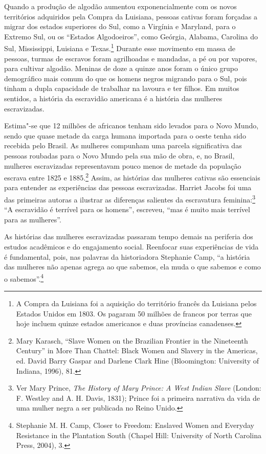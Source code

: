 Quando a produção de algodão aumentou exponencialmente com os novos
territórios adquiridos pela Compra da Luisiana, pessoas cativas
foram forçadas a migrar dos estados superiores do Sul, como a Virgínia e
Maryland, para o Extremo Sul, ou os ``Estados Algodoeiros'', como
Geórgia, Alabama, Carolina do Sul, Mississippi, Luisiana e
Texas.\footnote{A Compra da Luisiana foi a aquisição do território
  francês da Luisiana pelos Estados Unidos em 1803. Os  pagaram 50
  milhões de francos por terras que hoje incluem quinze estados
  americanos e duas províncias canadenses.} Durante esse movimento em
massa de pessoas, turmas de escravos foram agrilhoadas e
mandadas, a pé ou por vapores, para cultivar algodão. Meninas de doze a
quinze anos foram o único grupo demográfico mais comum do que os homens
negros migrando para o Sul, pois tinham a dupla capacidade de trabalhar
na lavoura e ter filhos. Em muitos sentidos, a história da escravidão
americana é a história das mulheres escravizadas.

Estima"-se que 12 milhões de africanos tenham sido levados para o Novo
Mundo, sendo que quase metade da carga humana importada para o oeste
tenha sido recebida pelo Brasil. As mulheres compunham uma parcela
significativa das pessoas roubadas para o Novo Mundo pela sua mão de
obra, e, no Brasil, mulheres escravizadas representavam
pouco menos de metade da população escrava entre 1825 e 1885.\footnote{Mary Karasch,
  ``Slave Women on the Brazilian Frontier in the Nineteenth Century'' in
  More Than Chattel: Black Women and Slavery in the Americas, ed. David
  Barry Gaspar and Darlene Clark Hine (Bloomington: University of
  Indiana, 1996), 81.} Assim, as histórias das mulheres cativas são
essenciais para entender as experiências das pessoas escravizadas.
Harriet Jacobs foi uma das primeiras autoras a ilustrar as diferenças
salientes da escravatura feminina:\footnote{Ver Mary Prince,
  \emph{The History of Mary Prince: A West Indian Slave} (London: F.
  Westley and A. H. Davis, 1831); Prince foi a primeira narrativa da
  vida de uma mulher negra a ser publicada no Reino Unido.} ``A
escravidão é terrível para os homens'', escreveu, ``mas é muito
mais terrível para as mulheres''.

As histórias das mulheres escravizadas
passaram tempo demais na periferia dos estudos acadêmicos e do
engajamento social. Reenfocar suas experiências de vida
é fundamental, pois, nas palavras da historiadora
Stephanie Camp, ``a história das mulheres não apenas agrega ao que
sabemos, ela muda o que sabemos e como o sabemos''.\footnote{Stephanie
  M. H. Camp, Closer to Freedom: Enslaved Women and Everyday Resistance
  in the Plantation South (Chapel Hill: University of North Carolina
  Press, 2004), 3.}


